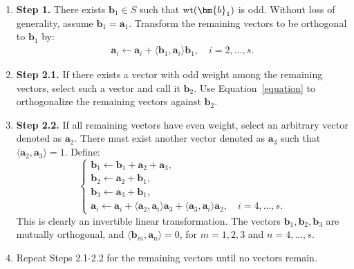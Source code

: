 \documentclass{article}
\theoremstyle{definition}
\theoremstyle{remark}
\begin{document}
\begin{enumerate}
\item \textbf{Step 1.} There exists $ \bm{b}_1 \in S $ such that $ {\rm wt}(\bm{b}_1) $ is odd. Without loss of generality, assume $ \bm{b}_1 = \bm{a}_1 $. Transform the remaining vectors to be orthogonal to $ \bm{b}_1 $ by:
  \begin{align}\label{equation}
    \bm{a}_i \leftarrow \bm{a}_i + \langle \bm{b}_1, \bm{a}_i \rangle \bm{b}_1, \quad i = 2, \ldots, s.
  \end{align}

\item \textbf{Step 2.1.} If there exists a vector with odd weight among the remaining vectors, select such a vector and call it $ \bm{b}_2$. Use Equation~\eqref{equation} to orthogonalize the remaining vectors against $ \bm{b}_2 $.

\item \textbf{Step 2.2.} If all remaining vectors have even weight, select an arbitrary vector denoted as $ \bm{a}_2$.
    There must exist another vector denoted as $ \bm{a}_3 $ such that $ \langle \bm{a}_2, \bm{a}_3 \rangle = 1 $.
    Define:
\[
  \begin{cases}
    \bm{b}_1 \leftarrow \bm{b}_1 + \bm{a}_2 + \bm{a}_3, \\
    \bm{b}_2 \leftarrow \bm{a}_2 + \bm{b}_1, \\
    \bm{b}_3 \leftarrow \bm{a}_3 + \bm{b}_1, \\
    \bm{a}_i \leftarrow \bm{a}_i + \langle \bm{a}_2, \bm{a}_i \rangle \bm{a}_3 + \langle \bm{a}_3, \bm{a}_i \rangle \bm{a}_2, \quad i = 4, \ldots, s.
  \end{cases}
\]
This is clearly an invertible linear transformation. The vectors $ \bm{b}_1, \bm{b}_2, \bm{b}_3 $ are mutually orthogonal, and $\langle \bm{b}_m, \bm{a}_n \rangle = 0$, for $m=1,2,3$ and $n=4,...,s$.

\item Repeat Steps 2.1-2.2 for the remaining vectors until no vectors remain.
\end{enumerate}
\end{document}
